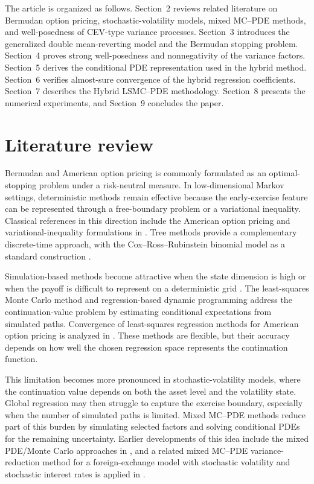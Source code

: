 \documentclass[10pt]{article}
\theoremstyle{plain}
\theoremstyle{definition}
\theoremstyle{remark}
\begin{document}
The article is organized as follows. Section~2 reviews related literature on Bermudan option pricing, stochastic-volatility models, mixed MC--PDE methods, and well-posedness of CEV-type variance processes. Section~3 introduces the generalized double mean-reverting model and the Bermudan stopping problem. Section~4 proves strong well-posedness and nonnegativity of the variance factors. Section~5 derives the conditional PDE representation used in the hybrid method. Section~6 verifies almost-sure convergence of the hybrid regression coefficients. Section~7 describes the Hybrid LSMC--PDE methodology. Section~8 presents the numerical experiments, and Section~9 concludes the paper.







\section{Literature review}

Bermudan and American option pricing is commonly formulated as an optimal-stopping problem under a risk-neutral measure. In low-dimensional Markov settings, deterministic methods remain effective because the early-exercise feature can be represented through a free-boundary problem or a variational inequality. Classical references in this direction include the American option pricing and variational-inequality formulations in \cite{merton1977americanput,jaillet1990variational}. Tree methods provide a complementary discrete-time approach, with the Cox--Ross--Rubinstein binomial model as a standard construction \cite{cox1979option}.

Simulation-based methods become attractive when the state dimension is high or when the payoff is difficult to represent on a deterministic grid \citep{glasserman2004montecarlo}. The least-squares Monte Carlo method \cite{longstaff2001valuing} and regression-based dynamic programming \cite{tsitsiklis2001regression} address the continuation-value problem by estimating conditional expectations from simulated paths. Convergence of least-squares regression methods for American option pricing is analyzed in \cite{clement2002analysis}. These methods are flexible, but their accuracy depends on how well the chosen regression space represents the continuation function.

This limitation becomes more pronounced in stochastic-volatility models, where the continuation value depends on both the asset level and the volatility state. Global regression may then struggle to capture the exercise boundary, especially when the number of simulated paths is limited. Mixed MC--PDE methods reduce part of this burden by simulating selected factors and solving conditional PDEs for the remaining uncertainty. Earlier developments of this idea include the mixed PDE/Monte Carlo approaches in \cite{loeper2009mixed,lipp2013mixing}, and a related mixed MC--PDE variance-reduction method for a foreign-exchange model with stochastic volatility and stochastic interest rates is applied in \cite{cozma2017mixed}.
\end{document}
